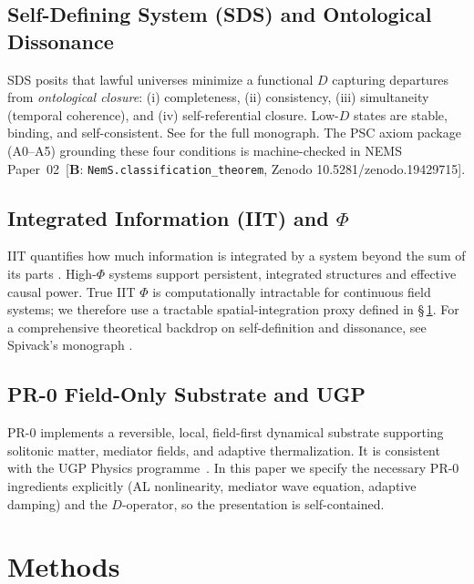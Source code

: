 \documentclass[12pt]{article}
\newcommand{\CatB}{\textbf{B}}
\begin{document}
\subsection{Self-Defining System (SDS) and Ontological Dissonance}
SDS posits that lawful universes minimize a functional $D$ capturing departures from \emph{ontological closure}: (i) completeness, (ii) consistency, (iii) simultaneity (temporal coherence), and (iv) self-referential closure. Low-$D$ states are stable, binding, and self-consistent. See \cite{spivack2025self_defining_universe} for the full monograph.
The PSC axiom package (A0--A5) grounding these four conditions is machine-checked in NEMS Paper~02~[$\CatB$: \texttt{NemS.classification\_theorem},
Zenodo 10.5281/\allowbreak zenodo.19429715].

\subsection{Integrated Information (IIT) and $\Phi$}
IIT quantifies how much information is integrated by a system beyond the sum of its parts \cite{tononi2004information}. High-$\Phi$ systems support persistent, integrated structures and effective causal power. True IIT $\Phi$ is computationally intractable for continuous field systems; we therefore use a tractable spatial-integration proxy defined in \S\,\ref{sec:methods}. For a comprehensive theoretical backdrop on self-definition and dissonance, see Spivack's monograph \cite{spivack2025self_defining_universe}.

\subsection{PR-0 Field-Only Substrate and UGP}
PR-0 implements a reversible, local, field-first dynamical substrate supporting solitonic matter, mediator fields, and adaptive thermalization. It is consistent with the UGP Physics programme~\cite{Spivack2025UGP,spivack2025first_principles_sm,SpivackUGPFormalization,ugp-lean,SpivackResearchProgrammes}. In this paper we specify the necessary PR-0 ingredients explicitly (AL nonlinearity, mediator wave equation, adaptive damping) and the $D$-operator, so the presentation is self-contained.

\section{Methods}\label{sec:methods}
\end{document}
